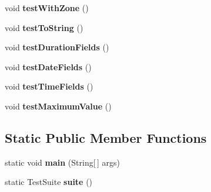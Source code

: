 \begin{DoxyCompactItemize}
\item 
\hypertarget{classorg_1_1joda_1_1time_1_1chrono_1_1_test_gregorian_chronology_ac28753cd8bbc2f093e1091866fad621a}{void {\bfseries test\-With\-Zone} ()}\label{classorg_1_1joda_1_1time_1_1chrono_1_1_test_gregorian_chronology_ac28753cd8bbc2f093e1091866fad621a}

\item 
\hypertarget{classorg_1_1joda_1_1time_1_1chrono_1_1_test_gregorian_chronology_a43dd69c23281ca132f715c284e942605}{void {\bfseries test\-To\-String} ()}\label{classorg_1_1joda_1_1time_1_1chrono_1_1_test_gregorian_chronology_a43dd69c23281ca132f715c284e942605}

\item 
\hypertarget{classorg_1_1joda_1_1time_1_1chrono_1_1_test_gregorian_chronology_a33455d9d7e812b2f2cb5f3e8f0d36b22}{void {\bfseries test\-Duration\-Fields} ()}\label{classorg_1_1joda_1_1time_1_1chrono_1_1_test_gregorian_chronology_a33455d9d7e812b2f2cb5f3e8f0d36b22}

\item 
\hypertarget{classorg_1_1joda_1_1time_1_1chrono_1_1_test_gregorian_chronology_ae0d3980560b9e487861503685d82330f}{void {\bfseries test\-Date\-Fields} ()}\label{classorg_1_1joda_1_1time_1_1chrono_1_1_test_gregorian_chronology_ae0d3980560b9e487861503685d82330f}

\item 
\hypertarget{classorg_1_1joda_1_1time_1_1chrono_1_1_test_gregorian_chronology_a2b8a143f9459807711f72c6919f07168}{void {\bfseries test\-Time\-Fields} ()}\label{classorg_1_1joda_1_1time_1_1chrono_1_1_test_gregorian_chronology_a2b8a143f9459807711f72c6919f07168}

\item 
\hypertarget{classorg_1_1joda_1_1time_1_1chrono_1_1_test_gregorian_chronology_a63dfa2974b5c3fcac3efdf55b060d8b3}{void {\bfseries test\-Maximum\-Value} ()}\label{classorg_1_1joda_1_1time_1_1chrono_1_1_test_gregorian_chronology_a63dfa2974b5c3fcac3efdf55b060d8b3}

\end{DoxyCompactItemize}
\subsection*{Static Public Member Functions}
\begin{DoxyCompactItemize}
\item 
\hypertarget{classorg_1_1joda_1_1time_1_1chrono_1_1_test_gregorian_chronology_a482c33dec2146f56c19a0b6d73f4fa12}{static void {\bfseries main} (String\mbox{[}$\,$\mbox{]} args)}\label{classorg_1_1joda_1_1time_1_1chrono_1_1_test_gregorian_chronology_a482c33dec2146f56c19a0b6d73f4fa12}

\item 
\hypertarget{classorg_1_1joda_1_1time_1_1chrono_1_1_test_gregorian_chronology_a9d89441e33d84b79a79929ba9a8eb3f5}{static Test\-Suite {\bfseries suite} ()}\label{classorg_1_1joda_1_1time_1_1chrono_1_1_test_gregorian_chronology_a9d89441e33d84b79a79929ba9a8eb3f5}

\end{DoxyCompactItemize}
